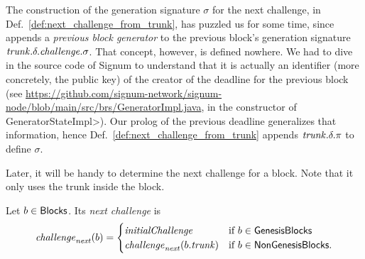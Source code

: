 %
The construction of the generation signature $\sigma$ for the next challenge,
in Def.~\ref{def:next_challenge_from_trunk},
has puzzled us for some time, since~\cite{SignumPlotting} appends a \emph{previous block generator}
to the previous block's generation signature ${\mathit{trunk}}.\delta.{\mathit{challenge}}.\sigma$.
That concept, however, is defined nowhere.
We had to dive in the source code of Signum to understand that it is actually
an identifier (more concretely, the public key)
of the creator of the deadline for the previous block
(see \url{https://github.com/signum-network/signum-node/blob/main/src/brs/GeneratorImpl.java},
in the constructor of \<GeneratorStateImpl>).
Our prolog of the previous deadline generalizes that information, hence
Def.~\ref{def:next_challenge_from_trunk} appends ${\mathit{trunk}}.\delta.\pi$ to define $\sigma$.

Later, it will be handy to determine the next challenge for a block. Note that
it only uses the trunk inside the block.
%
\begin{definition}\label{def:next_challenge_from_block}
  Let $b\in{\mathsf{Blocks}}$. Its \emph{next challenge} is
  \[
  {\mathit{challenge}}_{\mathit{next}}(b)=\begin{cases}
  {\mathit{initialChallenge}} & \text{if $b\in{\mathsf{GenesisBlocks}}$}\\
  {\mathit{challenge}}_{\mathit{next}}(b.{\mathit{trunk}}) & \text{if $b\in{\mathsf{NonGenesisBlocks}}$.}
  \end{cases}
  \]
\end{definition}


